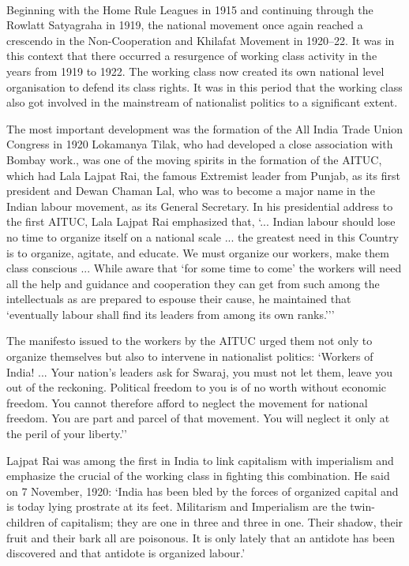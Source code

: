 \begin{multicols}{2}
\paragraph*{}
Beginning with the Home Rule Leagues in 1915 and continuing through the Rowlatt Satyagraha in 1919, the national movement once again reached a crescendo in the Non-Cooperation and Khilafat Movement in 1920--22. It was in this context that there occurred a resurgence of working class activity in the years from 1919 to 1922. The working class now created its own national level organisation to defend its class rights. It was in this period that the working class also got involved in the mainstream of nationalist politics to a significant extent.

The most important development was the formation of the All India Trade Union Congress in 1920 Lokamanya Tilak, who had developed a close association with Bombay work., was one of the moving spirits in the formation of the AITUC, which had Lala Lajpat Rai, the famous Extremist leader from Punjab, as its first president and Dewan Chaman Lal, who was to become a major name in the Indian labour movement, as its General Secretary. In his presidential address to the first AITUC, Lala Lajpat Rai emphasized that, `... Indian labour should lose no time to organize itself on a national scale ... the greatest need in this Country is to organize, agitate, and educate. We must organize our workers, make them class conscious ... While aware that `for some time to come' the workers will need all the help and guidance and cooperation they can get from such among the intellectuals as are prepared to espouse their cause, he maintained that `eventually labour shall find its leaders from among its own ranks.'''

The manifesto issued to the workers by the AITUC urged them not only to organize themselves but also to intervene in nationalist politics: `Workers of India! ... Your nation's leaders ask for Swaraj, you must not let them, leave you out of the reckoning. Political freedom to you is of no worth without economic freedom. You cannot therefore afford to neglect the movement for national freedom. You are part and parcel of that movement. You will neglect it only at the peril of your liberty.''

Lajpat Rai was among the first in India to link capitalism with imperialism and emphasize the crucial of the working class in fighting this combination. He said on 7 November, 1920: `India has been bled by the forces of organized capital and is today lying prostrate at its feet. Militarism and Imperialism are the twin-children of capitalism; they are one in three and three in one. Their shadow, their fruit and their bark all are poisonous. It is only lately that an antidote has been discovered and that antidote is organized labour.'


\end{multicols}
